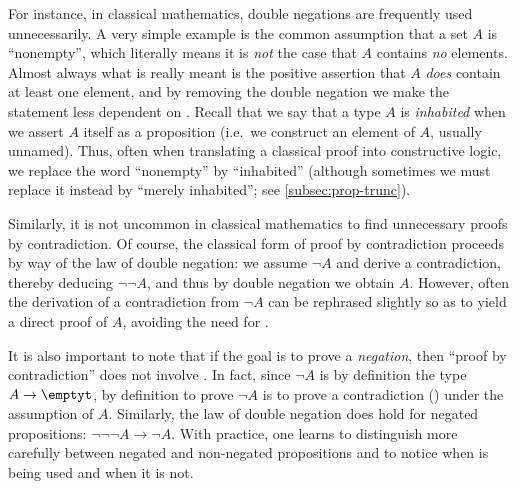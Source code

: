 For instance, in classical mathematics, double negations are frequently used unnecessarily.
A very simple example is the common assumption that a set $A$ is ``nonempty'', which literally means it is \emph{not} the case that $A$ contains \emph{no} elements.
Almost always what is really meant is the positive assertion that $A$ \emph{does} contain at least one element, and by removing the double negation we make the statement less dependent on \LEM{}.
Recall that we say that a type $A$ is \emph{inhabited}
%
when we assert $A$ itself as a proposition (i.e.\ we construct an element of $A$, usually unnamed).
Thus, often when translating a classical proof into constructive logic, we replace the word ``nonempty'' by ``inhabited'' (although sometimes we must replace it instead by ``merely inhabited''; see \cref{subsec:prop-trunc}).

Similarly, it is not uncommon in classical mathematics to find unnecessary proofs by contradiction.
%
Of course, the classical form of proof by contradiction proceeds by way of the law of double negation: we assume $\neg A$ and derive a contradiction, thereby deducing $\neg \neg A$, and thus by double negation we obtain $A$.
However, often the derivation of a contradiction from $\neg A$ can be rephrased slightly so as to yield a direct proof of $A$, avoiding the need for \LEM{}.

It is also important to note that if the goal is to prove a \emph{negation}, then ``proof by contradiction'' does not involve \LEM{}.
In fact, since $\neg A$ is by definition the type $A\to\emptyt$, by definition to prove $\neg A$ is to prove a contradiction (\emptyt) under the assumption of $A$.
Similarly, the law of double negation does hold for negated propositions: $\neg\neg\neg A \to \neg A$.
With practice, one learns to distinguish more carefully between negated and non-negated propositions and to notice when \LEM{} is being used and when it is not.

